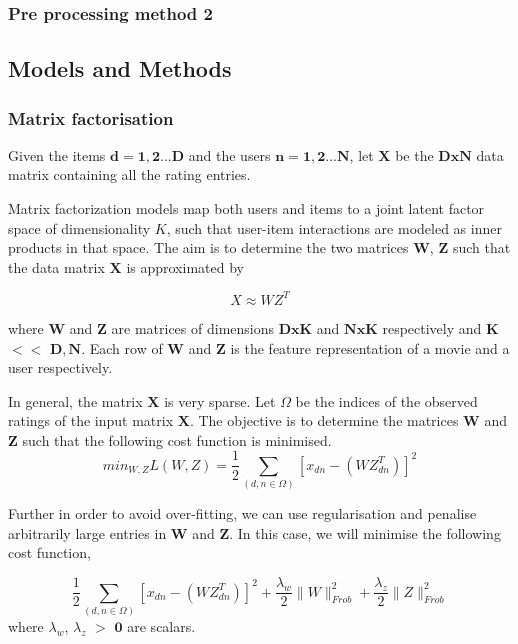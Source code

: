 \documentclass[10pt,conference,compsocconf]{IEEEtran}
\begin{document}
\subsubsection{Pre processing method 2}


\subsection{Models and Methods}
\subsubsection{Matrix factorisation}
Given the items $\mathbf{d = 1,2...D}$ and the users $\mathbf{n = 1,2...N}$, let $\mathbf{X}$ be the $\mathbf{DxN}$ data matrix containing all the rating entries.

Matrix factorization models map both users and items to a joint latent factor space of dimensionality $K$, such that user-item interactions are modeled as inner products in that space. The aim is to determine the two matrices $\mathbf{W}$, $\mathbf{Z}$ such that the data matrix $\mathbf{X}$ is approximated by 

\begin{equation}
X \approx W Z^{T}
\end{equation}  

where  $\mathbf{W}$ and $\mathbf{Z}$ are matrices of dimensions $\mathbf{DxK}$ and $\mathbf{NxK}$ respectively and 
$\mathbf{K}$ $<<$ $\mathbf{D, N}$. Each row of $\mathbf{W}$ and $\mathbf{Z}$ is the feature representation of a movie and a user respectively.

In general, the matrix $\mathbf{X}$ is very sparse. Let $\Omega$ be the indices of the observed ratings of the input matrix $\mathbf{X}$. The objective is to determine the matrices $\mathbf{W}$ and $\mathbf{Z}$ such that the following cost function is minimised.
\begin{equation}
min_{W,Z} L(W, Z) = \frac{1}{2}  \sum_{(d,n \in \Omega)} [x_{dn} - (WZ^{T}_{dn})]^2
\end{equation}

Further in order to avoid over-fitting, we can use regularisation and penalise arbitrarily large entries in $\mathbf{W}$ and $\mathbf{Z}$. In this case, we will minimise the following cost function,

\begin{equation}
\frac{1}{2}  \sum_{(d,n \in \Omega)} [x_{dn} - (WZ^{T}_{dn})]^2 + \frac{\lambda_{w}}{2} \parallel W \parallel ^{2}_{Frob} + \frac{\lambda_{z}}{2} \parallel Z \parallel ^{2}_{Frob} 
\end{equation}
where $\lambda_{w}$, $\lambda_{z}$ $>$ $\mathbf{0}$ are scalars.
\end{document}
